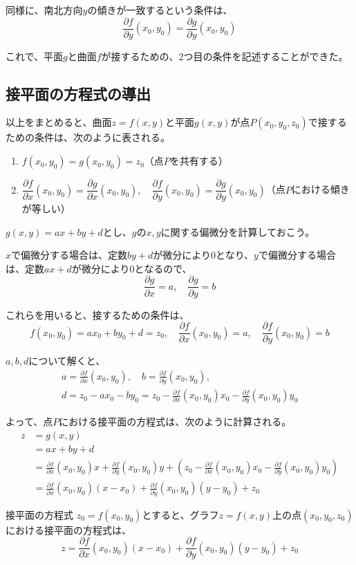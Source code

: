 \documentclass[../../../topic_calculus]{subfiles}
\begin{document}
同様に、南北方向$y$の傾きが一致するという条件は、
\begin{equation*}
  \frac{\partial f}{\partial y}(x_0,y_0) = \frac{\partial g}{\partial y}(x_0,y_0)
\end{equation*}

これで、平面$g$と曲面$f$が接するための、2つ目の条件を記述することができた。

\subsection{接平面の方程式の導出}

以上をまとめると、曲面$z=f(x,y)$と平面$g(x,y)$が点$P(x_0,y_0,z_0)$で接するための条件は、次のように表される。

\begin{enumerate}
  \item $f(x_0,y_0) = g(x_0,y_0) = z_0$（点$P$を共有する）
  \item $\dfrac{\partial f}{\partial x}(x_0,y_0) = \dfrac{\partial g}{\partial x}(x_0,y_0), \quad \dfrac{\partial f}{\partial y}(x_0,y_0) = \dfrac{\partial g}{\partial y}(x_0,y_0)$（点$P$における傾きが等しい）
\end{enumerate}

$g(x,y) = ax+by+d$とし、$g$の$x,y$に関する偏微分を計算しておこう。

$x$で偏微分する場合は、定数$by+d$が微分により$0$となり、$y$で偏微分する場合は、定数$ax+d$が微分により$0$となるので、
\begin{equation*}
  \frac{\partial g}{\partial x} = a, \quad
  \frac{\partial g}{\partial y} = b
\end{equation*}

これらを用いると、接するための条件は、
\begin{equation*}
  f(x_0,y_0) = ax_0 + by_0 + d = z_0, \quad
  \frac{\partial f}{\partial x}(x_0,y_0) = a, \quad
  \frac{\partial f}{\partial y}(x_0,y_0) = b
\end{equation*}

$a,b,d$について解くと、
\begin{gather*}
  a = \frac{\partial f}{\partial x}(x_0,y_0), \quad
  b = \frac{\partial f}{\partial y}(x_0,y_0), \\
  d = z_0 - ax_0 - by_0 = z_0 - \frac{\partial f}{\partial x}(x_0,y_0)x_0 - \frac{\partial f}{\partial y}(x_0,y_0)y_0
\end{gather*}

よって、点$P$における接平面の方程式は、次のように計算される。
\begin{align*}
  z &= g(x,y) \\
    &= ax + by + d \\
    &= \frac{\partial f}{\partial x}(x_0,y_0)x + \frac{\partial f}{\partial y}(x_0,y_0)y + \left( z_0 - \frac{\partial f}{\partial x}(x_0,y_0)x_0 - \frac{\partial f}{\partial y}(x_0,y_0)y_0 \right) \\
    &= \frac{\partial f}{\partial x}(x_0,y_0)(x - x_0) + \frac{\partial f}{\partial y}(x_0,y_0)(y - y_0) + z_0
\end{align*}

\begin{theorem}{接平面の方程式}
  $z_0 = f(x_0,y_0)$とすると、グラフ$z=f(x,y)$上の点$(x_0,y_0,z_0)$における接平面の方程式は、
  \begin{equation*}
    z = \frac{\partial f}{\partial x}(x_0,y_0)(x - x_0) + \frac{\partial f}{\partial y}(x_0,y_0)(y - y_0) + z_0
  \end{equation*}
\end{theorem}
\end{document}
